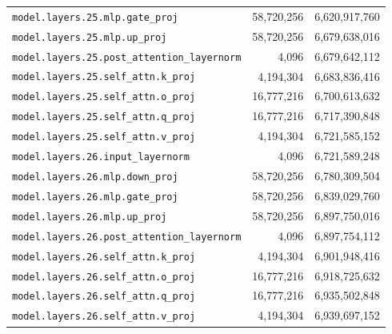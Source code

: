 \documentclass[10pt,a4paper]{article}
\theoremstyle{definition}
\begin{document}
\begin{appendices}
\begin{longtable}{p{9.5cm}rr}
\texttt{model.\allowbreak{}layers.\allowbreak{}25.\allowbreak{}mlp.\allowbreak{}gate\_proj} & 58,720,256 & 6,620,917,760 \\
\texttt{model.\allowbreak{}layers.\allowbreak{}25.\allowbreak{}mlp.\allowbreak{}up\_proj} & 58,720,256 & 6,679,638,016 \\
\texttt{model.\allowbreak{}layers.\allowbreak{}25.\allowbreak{}post\_attention\_layernorm} & 4,096 & 6,679,642,112 \\
\texttt{model.\allowbreak{}layers.\allowbreak{}25.\allowbreak{}self\_attn.\allowbreak{}k\_proj} & 4,194,304 & 6,683,836,416 \\
\texttt{model.\allowbreak{}layers.\allowbreak{}25.\allowbreak{}self\_attn.\allowbreak{}o\_proj} & 16,777,216 & 6,700,613,632 \\
\texttt{model.\allowbreak{}layers.\allowbreak{}25.\allowbreak{}self\_attn.\allowbreak{}q\_proj} & 16,777,216 & 6,717,390,848 \\
\texttt{model.\allowbreak{}layers.\allowbreak{}25.\allowbreak{}self\_attn.\allowbreak{}v\_proj} & 4,194,304 & 6,721,585,152 \\
\texttt{model.\allowbreak{}layers.\allowbreak{}26.\allowbreak{}input\_layernorm} & 4,096 & 6,721,589,248 \\
\texttt{model.\allowbreak{}layers.\allowbreak{}26.\allowbreak{}mlp.\allowbreak{}down\_proj} & 58,720,256 & 6,780,309,504 \\
\texttt{model.\allowbreak{}layers.\allowbreak{}26.\allowbreak{}mlp.\allowbreak{}gate\_proj} & 58,720,256 & 6,839,029,760 \\
\texttt{model.\allowbreak{}layers.\allowbreak{}26.\allowbreak{}mlp.\allowbreak{}up\_proj} & 58,720,256 & 6,897,750,016 \\
\texttt{model.\allowbreak{}layers.\allowbreak{}26.\allowbreak{}post\_attention\_layernorm} & 4,096 & 6,897,754,112 \\
\texttt{model.\allowbreak{}layers.\allowbreak{}26.\allowbreak{}self\_attn.\allowbreak{}k\_proj} & 4,194,304 & 6,901,948,416 \\
\texttt{model.\allowbreak{}layers.\allowbreak{}26.\allowbreak{}self\_attn.\allowbreak{}o\_proj} & 16,777,216 & 6,918,725,632 \\
\texttt{model.\allowbreak{}layers.\allowbreak{}26.\allowbreak{}self\_attn.\allowbreak{}q\_proj} & 16,777,216 & 6,935,502,848 \\
\texttt{model.\allowbreak{}layers.\allowbreak{}26.\allowbreak{}self\_attn.\allowbreak{}v\_proj} & 4,194,304 & 6,939,697,152 \\

\end{longtable}
\end{appendices}
\end{document}
